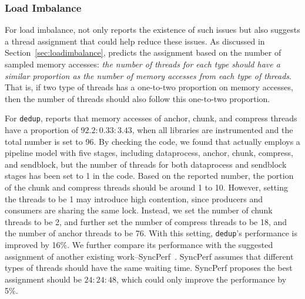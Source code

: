 

\subsubsection{Load Imbalance}

For load imbalance, \NP{} not only reports the existence of such issues but also suggests a thread assignment that could help reduce these issues. As discussed in Section~\ref{sec:loadimbalance}, \NP{} predicts the assignment based on the number of sampled memory accesses: \textit{the number of threads for each type should have a similar proportion as the number of memory accesses from each type of threads}. That is, if two type
of threads has a one-to-two proportion on memory accesses, then the number of threads should also follow this one-to-two proportion. 

For \texttt{dedup}, \NP{} reports that memory accesses of anchor, chunk, and compress threads have a proportion of $92.2:0.33:3.43$, when all libraries are instrumented and the total number is set to 96. By checking the code, we found that  actually employs a pipeline model with five stages, including  dataprocess, anchor, chunk,  compress, and sendblock, but the number of threads for both dataprocess and sendblock stages has been set to 1 in the code.  Based on the reported number, the portion of the chunk and compress threads should be around 1 to 10. However, setting the threads to be 1 may introduce high contention, since producers and consumers are sharing the same lock. Instead, we set the number of chunk threads to be 2, and further set the number of compress threads to be 18, and the number of anchor threads to be 76. 
With this setting, \texttt{dedup}'s performance is improved by 16\%. We further compare its performance with the suggested assignment of another existing work--SyncPerf~\cite{SyncPerf}. SyncPerf assumes that different types of threads should have the same waiting time. SyncPerf proposes the best assignment should be $24:24:48$, which could only improve the performance by 5\%. 

